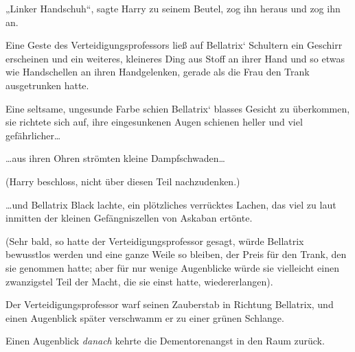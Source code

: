 „Linker Handschuh“, sagte Harry zu seinem Beutel, zog ihn heraus und zog ihn an.

Eine Geste des Verteidigungsprofessors ließ auf Bellatrix‘ Schultern ein Geschirr erscheinen und ein weiteres, kleineres Ding aus Stoff an ihrer Hand und so etwas wie Handschellen an ihren Handgelenken, gerade als die Frau den Trank ausgetrunken hatte.

Eine seltsame, ungesunde Farbe schien Bellatrix‘ blasses Gesicht zu überkommen, sie richtete sich auf, ihre eingesunkenen Augen schienen heller und viel gefährlicher…

…aus ihren Ohren strömten kleine Dampfschwaden…

(Harry beschloss, nicht über diesen Teil nachzudenken.)

…und Bellatrix Black lachte, ein plötzliches verrücktes Lachen, das viel zu laut inmitten der kleinen Gefängniszellen von Askaban ertönte.

(Sehr bald, so hatte der Verteidigungsprofessor gesagt, würde Bellatrix bewusstlos werden und eine ganze Weile so bleiben, der Preis für den Trank, den sie genommen hatte; aber für nur wenige Augenblicke würde sie vielleicht einen zwanzigstel Teil der Macht, die sie einst hatte, wiedererlangen).

Der Verteidigungsprofessor warf seinen Zauberstab in Richtung Bellatrix, und einen Augenblick später verschwamm er zu einer grünen Schlange.

Einen Augenblick \emph{danach} kehrte die Dementorenangst in den Raum zurück.

